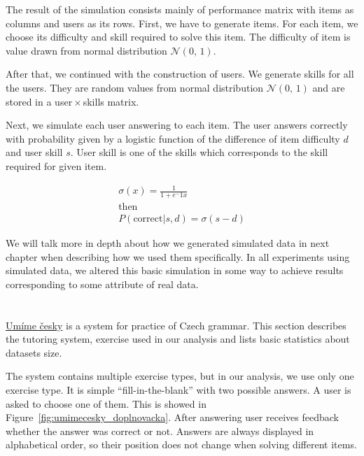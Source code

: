 \documentclass[
  printed, %
  table,   %
  nolof,     %
  nolot,     %
  color,
  final,
  nocover
]{fithesis3}
\begin{document}
The result of the simulation consists mainly of performance matrix with items as columns and users as its rows. First, we have to generate items. For each item, we choose its difficulty and skill required to solve this item. The difficulty of item is value drawn from normal distribution $\mathcal{N}(0,\,1)$.

After that, we continued with the construction of users. We generate skills for all the users. They are random values from normal distribution $\mathcal{N}(0,\,1)$ and are stored in a user\,$\times$\,skills matrix.

Next, we simulate each user answering to each item. The user answers correctly with probability given by a logistic function of the difference of item difficulty $d$ and user skill $s$. User skill is one of the skills which corresponds to the skill required for given item.

\begin{gather*}
\sigma(x) = \frac{1}{1 + e^-1x} \\
\text{then}\\
P(\text{correct}|s, d) = \sigma(s - d)
\end{gather*}

We will talk more in depth about how we generated simulated data in next chapter when describing how we used them specifically. In all experiments using simulated data, we altered this basic simulation in some way to achieve results corresponding to some attribute of real data.


\section{\umimeCesky{}}\label{umime-cesky}


\href{https://umimecesky.cz/}{Umíme česky} is a system for practice of Czech grammar. This section describes the tutoring system, exercise used in our analysis and lists basic statistics about datasets size.

The system contains multiple exercise types, but in our analysis, we use only one exercise type. It is simple ``fill-in-the-blank'' with two possible answers. A user is asked to choose one of them. This is showed in Figure~\ref{fig:umimecesky_doplnovacka}. After answering user receives feedback whether the answer was correct or not. Answers are always displayed in alphabetical order, so their position does not change when solving different items.
\end{document}

